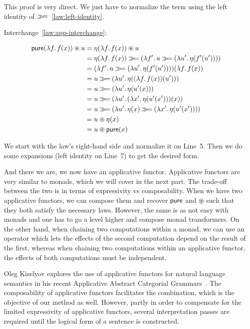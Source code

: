 This proof is very direct. We just have to normalize the term using the
left identity of $\mathbin{\gg\!=}$~\eqref{law:left-identity}.

\pagebreak[3]

Interchange~\eqref{law:app-interchange}:

\setcounter{TemporaryCounter}{\value{equation}}
\setcounter{equation}{0}
\NoChapterPrefix
\begin{align}
\pure(\lam{f}{f(x)}) \circledast u
&= \eta(\lam{f}{f(x)}) \circledast u \\
&= \eta(\lam{f}{f(x)}) \hsbind (\lam{f'}{u \hsbind (\lam{u'}{\eta(f'(u'))})}) \\
&= (\lam{f'}{u \hsbind (\lam{u'}{\eta(f'(u'))})})(\lam{f}{f(x)}) \\
&= u \hsbind (\lam{u'}{\eta((\lam{f}{f(x)})(u'))}) \\
&= u \hsbind (\lam{u'}{\eta(u'(x))}) \\
&= u \hsbind (\lam{u'}{(\lam{x'}{\eta(u'(x'))})(x)}) \\
&= u \hsbind (\lam{u'}{\eta(x) \hsbind (\lam{x'}{\eta(u'(x'))})}) \\
&= u \circledast \eta(x) \\
&= u \circledast \pure(x)
\end{align}
\setcounter{equation}{\value{TemporaryCounter}}
\ChapterPrefix

We start with the law's right-hand side and normalize it on Line~5. Then we
do some expansions (left identity on Line~7) to get the desired form.

And there we are, we now have an applicative functor. Applicative functors
are very similar to monads, which we will cover in the next part. The
trade-off between the two is in terms of expressivity vs
composability. When we have two applicative functors, we can compose them
and recover $\mathsf{pure}$ and $\circledast$ such that they both satisfy the
necessary laws. However, the same is as not easy with monads and one has to
go a level higher and compose monad transformers. On the other hand, when
chaining two computations within a monad, we can use an operator which lets
the effects of the second computation depend on the result of the first,
whereas when chaining two computations within an applicative functor, the
effects of both computations must be independent.

Oleg Kiselyov explores the use of applicative functors for natural language
semantics in his recent Applicative Abstract Categorial
Grammars~\cite{kiselyov2015applicative,kiselyov2015swing}. The
composability of applicative functors facilitates the combination, which is
the objective of our method as well. However, partly in order to compensate
for the limited expressivity of applicative functors, several
interpretation passes are required until the logical form of a sentence is
constructed.

